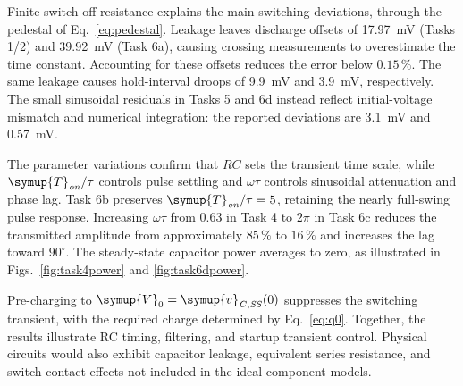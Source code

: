 \documentclass[12pt,a4paper]{article}
\begin{document}
	Finite switch off-resistance explains the main switching deviations,
	through the pedestal of Eq.~\eqref{eq:pedestal}.  Leakage leaves
	discharge offsets of \SI{17.97}{\milli\volt}
	(Tasks 1/2) and \SI{39.92}{\milli\volt} (Task 6a), causing crossing
	measurements to overestimate the time constant.  Accounting for
	these offsets reduces the error below $0.15\,\%$.  The same leakage
	causes hold-interval droops of \SI{9.9}{\milli\volt} and
	\SI{3.9}{\milli\volt}, respectively.  The small sinusoidal residuals
	in Tasks 5 and 6d instead reflect initial-voltage mismatch and
	numerical integration: the reported deviations are
	\SI{3.1}{\milli\volt} and \SI{0.57}{\milli\volt}.
	
	The parameter variations confirm that $RC$ sets the transient time
	scale, while $\symup{T}_{\mathit{on}}/\tau$ controls pulse settling and $\omega\tau$
	controls sinusoidal attenuation and phase lag.  Task 6b preserves
	$\symup{T}_{\mathit{on}}/\tau=5$, retaining the nearly full-swing pulse response.
	Increasing $\omega\tau$ from $0.63$ in Task 4 to $2\pi$ in Task 6c
	reduces the transmitted amplitude from approximately $85\,\%$ to
	$16\,\%$ and increases the lag toward $90^\circ$.
	The steady-state capacitor power averages to zero, as illustrated
	in Figs.~\ref{fig:task4power} and \ref{fig:task6dpower}.
	
	Pre-charging to $\symup{V}_{0}=\symup{v}_{\mathit{C,SS}}(0)$ suppresses the switching
	transient, with the required charge determined by Eq.~\eqref{eq:q0}.
	Together, the results illustrate RC timing, filtering, and startup
	transient control.  Physical circuits would also exhibit capacitor
	leakage, equivalent series resistance, and switch-contact effects
	not included in the ideal component models.
	
\end{document}
